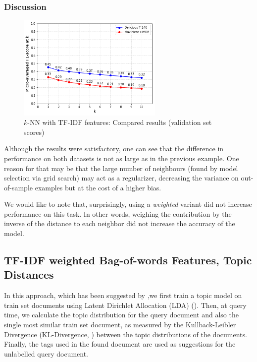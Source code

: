 \subsubsection{Discussion}

\begin{figure}[H]
    \centering
    \includegraphics[width=7cm]{chapters/05_experiments/images/proposal-1-compared-knn-tfidf.png}
    \caption{$k$-NN with TF-IDF features: Compared results (validation set scores)}
    \label{fig:compared_ovr_svm}
\end{figure}

Although the results were satisfactory, one can see that the difference in performance on both datasets is not as large as in the previous example. One reason for that may be that the large number of neighbours (found by model selection via grid search) may act as a regularizer, decreasing the variance on out-of-sample examples but at the cost of a higher bias.

 We would like to note that, surprisingly, using a \textit{weighted} variant did not increase performance on this task. In other words, weighing the contribution by the inverse of the distance to each neighbor did not increase the accuracy of the model.

\subsection{TF-IDF weighted Bag-of-words Features, Topic Distances}

In this approach, which has been suggested by \cite{choubey_2011},we first train a topic model on train set documents using Latent Dirichlet Allocation (LDA) (\cite{blei_etal_2003}). Then, at query time, we calculate the topic distribution for the query document and also the single most similar train set document, as measured by the Kullback-Leibler Divergence (KL-Divergence, \cite{kullback_leibler_1951}) between the topic distributions of the documents. Finally, the tags used in the found document are used as suggestions for the unlabelled query document.

